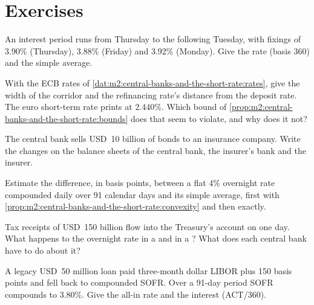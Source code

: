 \section{Exercises}

\begin{exercise}[$\star$]\label{exo:m2:central-banks-and-the-short-rate:1}
An interest period runs from Thursday to the following Tuesday, with fixings
of 3.90\% (Thursday), 3.88\% (Friday) and 3.92\% (Monday). Give the rate
 (basis 360) and the simple average.
\end{exercise}

\begin{exercise}[$\star$]\label{exo:m2:central-banks-and-the-short-rate:2}
With the ECB rates of \cref{dat:m2:central-banks-and-the-short-rate:rates},
give the width of the corridor and the refinancing rate's distance from the
deposit rate. The euro short-term rate prints at 2.440\%. Which bound of
\cref{prop:m2:central-banks-and-the-short-rate:bounds} does that seem to
violate, and why does it not?
\end{exercise}

\begin{exercise}[$\star$]\label{exo:m2:central-banks-and-the-short-rate:3}
The central bank sells USD~10 billion of bonds to an insurance company. Write
the changes on the balance sheets of the central bank, the insurer's bank and
the insurer.
\end{exercise}

\begin{exercise}[$\star\star$]\label{exo:m2:central-banks-and-the-short-rate:4}
Estimate the difference, in basis points, between a flat 4\% overnight rate
compounded daily over 91 calendar days and its simple average, first with
\cref{prop:m2:central-banks-and-the-short-rate:convexity} and then exactly.
\end{exercise}

\begin{exercise}[$\star\star$]\label{exo:m2:central-banks-and-the-short-rate:5}
Tax receipts of USD~150 billion flow into the Treasury's account on one day.
What happens to the overnight rate in a  and in a ? What does each central bank have to do about it?
\end{exercise}

\begin{exercise}[$\star\star$]\label{exo:m2:central-banks-and-the-short-rate:6}
A legacy USD~50 million loan paid three-month dollar LIBOR plus 150 basis
points and fell back to compounded SOFR. Over a 91-day period SOFR compounds
to 3.80\%. Give the all-in rate and the interest (ACT/360).
\end{exercise}

